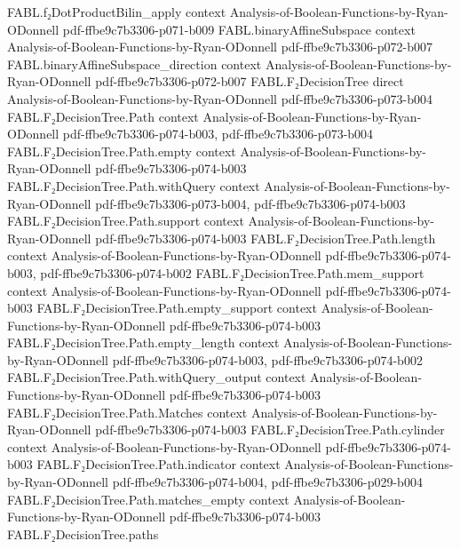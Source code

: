 \begin{theorem}
  {FABL.f₂DotProductBilin_apply}
  {context}
  {Analysis-of-Boolean-Functions-by-Ryan-ODonnell}
  {pdf-ffbe9c7b3306-p071-b009}
\proofstep
  {FABL.binaryAffineSubspace}
  {context}
  {Analysis-of-Boolean-Functions-by-Ryan-ODonnell}
  {pdf-ffbe9c7b3306-p072-b007}
\proofstep
  {FABL.binaryAffineSubspace_direction}
  {context}
  {Analysis-of-Boolean-Functions-by-Ryan-ODonnell}
  {pdf-ffbe9c7b3306-p072-b007}
\proofstep
  {FABL.F₂DecisionTree}
  {direct}
  {Analysis-of-Boolean-Functions-by-Ryan-ODonnell}
  {pdf-ffbe9c7b3306-p073-b004}
\proofstep
  {FABL.F₂DecisionTree.Path}
  {context}
  {Analysis-of-Boolean-Functions-by-Ryan-ODonnell}
  {pdf-ffbe9c7b3306-p074-b003,
    pdf-ffbe9c7b3306-p073-b004}
\proofstep
  {FABL.F₂DecisionTree.Path.empty}
  {context}
  {Analysis-of-Boolean-Functions-by-Ryan-ODonnell}
  {pdf-ffbe9c7b3306-p074-b003}
\proofstep
  {FABL.F₂DecisionTree.Path.withQuery}
  {context}
  {Analysis-of-Boolean-Functions-by-Ryan-ODonnell}
  {pdf-ffbe9c7b3306-p073-b004,
    pdf-ffbe9c7b3306-p074-b003}
\proofstep
  {FABL.F₂DecisionTree.Path.support}
  {context}
  {Analysis-of-Boolean-Functions-by-Ryan-ODonnell}
  {pdf-ffbe9c7b3306-p074-b003}
\proofstep
  {FABL.F₂DecisionTree.Path.length}
  {context}
  {Analysis-of-Boolean-Functions-by-Ryan-ODonnell}
  {pdf-ffbe9c7b3306-p074-b003,
    pdf-ffbe9c7b3306-p074-b002}
\proofstep
  {FABL.F₂DecisionTree.Path.mem_support}
  {context}
  {Analysis-of-Boolean-Functions-by-Ryan-ODonnell}
  {pdf-ffbe9c7b3306-p074-b003}
\proofstep
  {FABL.F₂DecisionTree.Path.empty_support}
  {context}
  {Analysis-of-Boolean-Functions-by-Ryan-ODonnell}
  {pdf-ffbe9c7b3306-p074-b003}
\proofstep
  {FABL.F₂DecisionTree.Path.empty_length}
  {context}
  {Analysis-of-Boolean-Functions-by-Ryan-ODonnell}
  {pdf-ffbe9c7b3306-p074-b003,
    pdf-ffbe9c7b3306-p074-b002}
\proofstep
  {FABL.F₂DecisionTree.Path.withQuery_output}
  {context}
  {Analysis-of-Boolean-Functions-by-Ryan-ODonnell}
  {pdf-ffbe9c7b3306-p074-b003}
\proofstep
  {FABL.F₂DecisionTree.Path.Matches}
  {context}
  {Analysis-of-Boolean-Functions-by-Ryan-ODonnell}
  {pdf-ffbe9c7b3306-p074-b003}
\proofstep
  {FABL.F₂DecisionTree.Path.cylinder}
  {context}
  {Analysis-of-Boolean-Functions-by-Ryan-ODonnell}
  {pdf-ffbe9c7b3306-p074-b003}
\proofstep
  {FABL.F₂DecisionTree.Path.indicator}
  {context}
  {Analysis-of-Boolean-Functions-by-Ryan-ODonnell}
  {pdf-ffbe9c7b3306-p074-b004,
    pdf-ffbe9c7b3306-p029-b004}
\proofstep
  {FABL.F₂DecisionTree.Path.matches_empty}
  {context}
  {Analysis-of-Boolean-Functions-by-Ryan-ODonnell}
  {pdf-ffbe9c7b3306-p074-b003}
\proofstep
  {FABL.F₂DecisionTree.paths}

\end{theorem}
